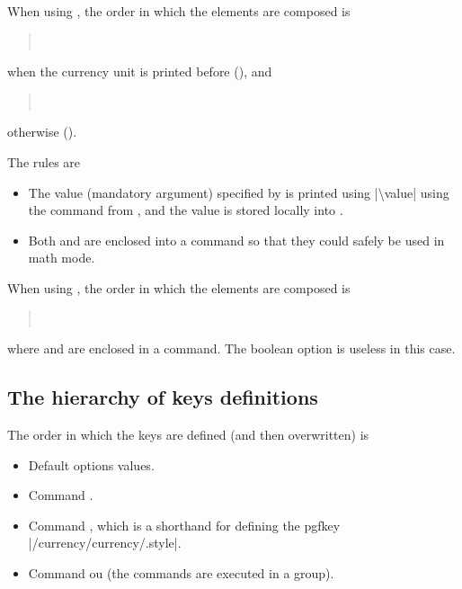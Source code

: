 \documentclass[12pt,add-index]{cnltx-doc}
\begin{document}
When using , the order in which the elements are composed is 
\begin{quote}
    \ \ \ \ \
    \ 
\end{quote}
when the currency unit is printed before (), and 
\begin{quote}
     \ \ \ \ \ \ 
\end{quote}
otherwise ().

The rules are
\begin{itemize}[leftmargin=2em,itemsep=0pt]
    \item The value (mandatory argument) specified by  is printed
	using \verbcode|\num{\value}| using the \cs{num} command from , and the value
	is stored locally into \cs*{value}.
    \item Both  and  are enclosed into a  command
	so that they could safely be used in math mode.
\end{itemize}

When using , the order in which the elements are composed is 
\begin{quote}
    \ \ \ \ 
\end{quote}
where  and  are enclosed in a  command.
The boolean option \option{pre} is useless in this case.

\subsection{The hierarchy of keys definitions}

The order in which the keys are defined (and then overwritten) is
\begin{itemize}[leftmargin=2em,itemsep=0pt]
    \item Default options values.
    \item Command .
    \item Command , which is a shorthand for defining 
	the pgfkey \verbcode|/currency/currency/.style|. 
    \item Command  ou  (the commands are executed
	in a group).
\end{itemize}
\end{document}
